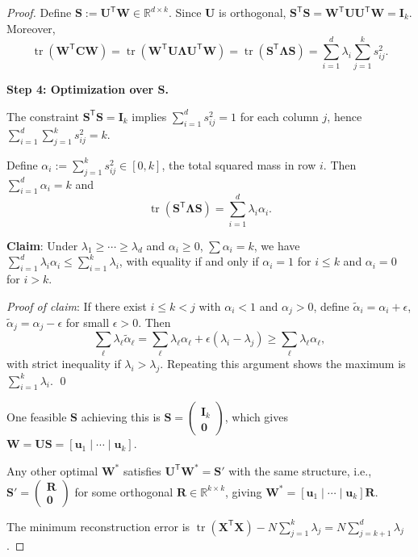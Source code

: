 \begin{proof}
  Define $\mathbf{S} := \mathbf{U}^{\mathsf{T}}\mathbf{W} \in \mathbb{R}^{d \times k}$. Since $\mathbf{U}$ is orthogonal, $\mathbf{S}^{\mathsf{T}}\mathbf{S} = \mathbf{W}^{\mathsf{T}}\mathbf{U}\mathbf{U}^{\mathsf{T}}\mathbf{W} = \mathbf{I}_k$.
  Moreover,
  \[
    \operatorname{tr}(\mathbf{W}^{\mathsf{T}}\mathbf{C}\mathbf{W}) = \operatorname{tr}(\mathbf{W}^{\mathsf{T}}\mathbf{U}\mathbf{\Lambda}\mathbf{U}^{\mathsf{T}}\mathbf{W}) = \operatorname{tr}(\mathbf{S}^{\mathsf{T}}\mathbf{\Lambda}\mathbf{S}) = \sum_{i=1}^{d} \lambda_i \sum_{j=1}^{k} s_{ij}^2.
  \]

  \textbf{Step 4: Optimization over $\mathbf{S}$.}

  The constraint $\mathbf{S}^{\mathsf{T}}\mathbf{S} = \mathbf{I}_k$ implies $\sum_{i=1}^{d} s_{ij}^2 = 1$ for each column $j$, hence $\sum_{i=1}^{d} \sum_{j=1}^{k} s_{ij}^2 = k$.

  Define $\alpha_i := \sum_{j=1}^{k} s_{ij}^2 \in [0, k]$, the total squared mass in row $i$. Then $\sum_{i=1}^{d} \alpha_i = k$ and
  \[
    \operatorname{tr}(\mathbf{S}^{\mathsf{T}}\mathbf{\Lambda}\mathbf{S}) = \sum_{i=1}^{d} \lambda_i \alpha_i.
  \]

  \textbf{Claim}: Under $\lambda_1 \geq \cdots \geq \lambda_d$ and $\alpha_i \geq 0$, $\sum \alpha_i = k$, we have $\sum_{i=1}^{d} \lambda_i \alpha_i \leq \sum_{i=1}^{k} \lambda_i$, with equality if and only if $\alpha_i = 1$ for $i \leq k$ and $\alpha_i = 0$ for $i > k$.

  \textit{Proof of claim}: If there exist $i \leq k < j$ with $\alpha_i < 1$ and $\alpha_j > 0$, define $\widetilde{\alpha}_i = \alpha_i + \epsilon$, $\widetilde{\alpha}_j = \alpha_j - \epsilon$ for small $\epsilon > 0$. Then
  \[
    \sum_{\ell} \lambda_{\ell} \widetilde{\alpha}_{\ell} = \sum_{\ell} \lambda_{\ell} \alpha_{\ell} + \epsilon(\lambda_i - \lambda_j) \geq \sum_{\ell} \lambda_{\ell} \alpha_{\ell},
  \]
  with strict inequality if $\lambda_i > \lambda_j$. Repeating this argument shows the maximum is $\sum_{i=1}^{k} \lambda_i$. \qed

  One feasible $\mathbf{S}$ achieving this is $\mathbf{S} = \begin{pmatrix} \mathbf{I}_k \\ \mathbf{0} \end{pmatrix}$, which gives $\mathbf{W} = \mathbf{U}\mathbf{S} = [\mathbf{u}_1 \mid \cdots \mid \mathbf{u}_k]$.

  Any other optimal $\mathbf{W}^*$ satisfies $\mathbf{U}^{\mathsf{T}}\mathbf{W}^* = \mathbf{S}'$ with the same structure, i.e., $\mathbf{S}' = \begin{pmatrix} \mathbf{R} \\ \mathbf{0} \end{pmatrix}$ for some orthogonal $\mathbf{R} \in \mathbb{R}^{k \times k}$, giving $\mathbf{W}^* = [\mathbf{u}_1 \mid \cdots \mid \mathbf{u}_k]\mathbf{R}$.

  The minimum reconstruction error is $\operatorname{tr}(\mathbf{X}^{\mathsf{T}}\mathbf{X}) - N \sum_{j=1}^{k}\lambda_j = N \sum_{j=k+1}^{d} \lambda_j$.
\end{proof}

